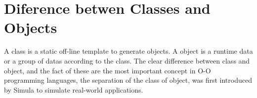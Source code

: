\section{Diference betwen Classes and Objects}

A class is a static off-line template to generate objects. 
A object is a runtime data or a group of datas 
according to the class. The clear difference between 
class and object, and the fact of these are 
the most important concept in O-O programming 
languages, the separation of the class of object, 
was first introduced by Simula \cite{Dahl:1970} 
to simulate real-world applications. 



